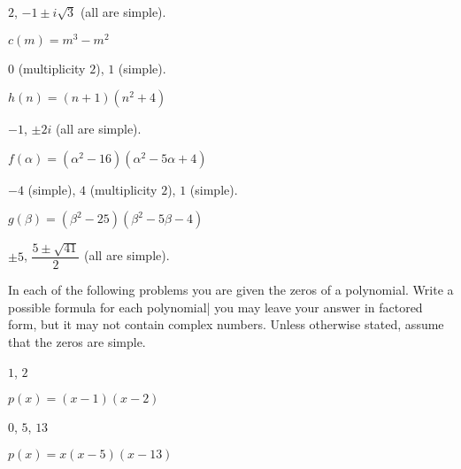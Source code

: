 \begin{exercises}
\begin{problem}[Zeros]
\begin{multicols}{3}
\begin{subproblem}
\begin{shortsolution}
			$2$, $-1\pm i\sqrt{3}$ (all are simple).
		\end{shortsolution}
	\end{subproblem}
	\begin{subproblem}
		$c(m)=m^3-m^2$
		\begin{shortsolution}
			$0$ (multiplicity $2$), $1$ (simple).
		\end{shortsolution}
	\end{subproblem}
	\begin{subproblem}
		$h(n)=(n+1)(n^2+4)$
		\begin{shortsolution}
			$-1$, $\pm 2i$ (all are simple).
		\end{shortsolution}
	\end{subproblem}
	\begin{subproblem}
		$f(\alpha)=(\alpha^2-16)(\alpha^2-5\alpha+4)$
		\begin{shortsolution}
			$-4$ (simple), $4$ (multiplicity $2$), $1$ (simple).
		\end{shortsolution}
	\end{subproblem}
	\begin{subproblem}
		$g(\beta)=(\beta^2-25)(\beta^2-5\beta-4)$
		\begin{shortsolution}
			$\pm 5$, $\dfrac{5\pm\sqrt{41}}{2}$ (all are simple).
		\end{shortsolution}
	\end{subproblem}
\end{multicols}
\end{problem}
\begin{problem}
In each of the following problems you are given the zeros of a polynomial.
Write a possible formula for each polynomial| you may leave your
answer in factored form, but it may not contain complex numbers. Unless
otherwise stated, assume that the zeros are simple.
\begin{multicols}{3}
	\begin{subproblem}
		$1$, $2$
		\begin{shortsolution}
			$p(x)=(x-1)(x-2)$
		\end{shortsolution}
	\end{subproblem}
	\begin{subproblem}
		$0$, $5$, $13$
		\begin{shortsolution}
			$p(x)=x(x-5)(x-13)$
		\end{shortsolution}
	\end{subproblem}

\end{multicols}
\end{problem}
\end{exercises}
